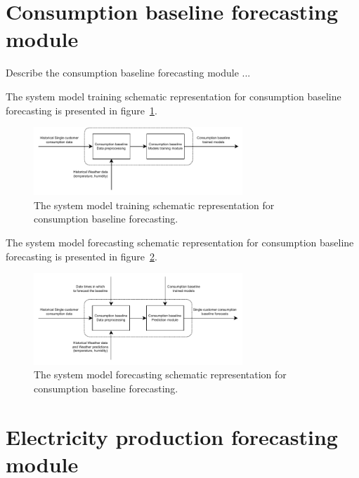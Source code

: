 \section{Consumption baseline forecasting module}
\label{sec:baselinemodel}
\vspace{0.2 cm}

Describe the consumption baseline forecasting module ...

The system model training schematic representation for consumption baseline forecasting is presented in figure~\ref{fig:modeltrainingbaseline}.

\begin{figure}[H]
\centering 
\includegraphics[width=0.7\textwidth]{images/system_model_training_baseline}
\caption{The system model training schematic representation for consumption baseline forecasting.}
\label{fig:modeltrainingbaseline}
\end{figure}

The system model forecasting schematic representation for consumption baseline forecasting is presented in figure~\ref{fig:modelforecastingbaseline}.

\begin{figure}[H]
\centering 
\includegraphics[width=0.7\textwidth]{images/system_model_forecasting_baseline}
\caption{The system model forecasting schematic representation for consumption baseline forecasting.}
\label{fig:modelforecastingbaseline}
\end{figure}


\section{Electricity production forecasting module}
\label{sec:productionmodel}
\vspace{0.2 cm}

